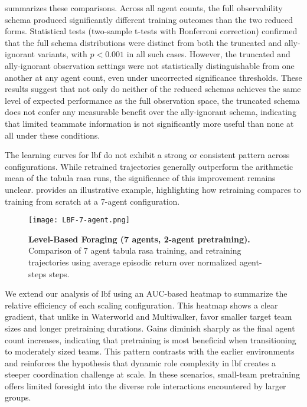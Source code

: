 \documentclass{article}
\begin{document}
 summarizes these comparisons. 
Across all agent counts, the full observability schema produced 
significantly different training outcomes than the two reduced forms. 
Statistical tests (two-sample t-tests with Bonferroni correction) 
confirmed that the full schema distributions were distinct from both the 
truncated and ally-ignorant variants, with $p < 0.001$ in all such cases. 
However, the truncated and ally-ignorant observation settings were not 
statistically distinguishable from one another at any agent count, 
even under uncorrected significance thresholds. 
These results suggest that not only do neither of 
the reduced schemas achieves the same level of 
expected performance as the full observation space, 
the truncated schema does not confer any measurable 
benefit over the ally-ignorant schema, indicating 
that limited teammate information is not significantly 
more useful than none at all under these conditions.

The learning curves for \gls{lbf} do not exhibit a strong or consistent 
pattern across configurations. While retrained trajectories 
generally outperform the arithmetic mean of the tabula rasa runs, 
the significance of this improvement remains unclear. 
 provides an illustrative example, highlighting how 
retraining compares to training from scratch at a 7-agent configuration.

\begin{figure}[!ht]
    \centering
    \texttt{[image: LBF-7-agent.png]}
    \caption{\textbf{Level-Based Foraging (7 agents, 2-agent pretraining).} Comparison of 
    7 agent tabula rasa training, and retraining trajectories using average 
    episodic return over normalized agent-steps steps.}
    \label{con1:fig:lbf-7}
\end{figure}

We extend our analysis of \gls{lbf} using an AUC-based heatmap to summarize the 
relative efficiency of each scaling configuration. 
This heatmap shows a clear gradient, that unlike in Waterworld and Multiwalker, 
favor smaller target team sizes and longer pretraining durations. 
Gains diminish sharply as the final agent count increases, 
indicating that pretraining is most beneficial when transitioning to moderately sized teams. 
This pattern contrasts with the earlier environments and reinforces the hypothesis that 
dynamic role complexity in \gls{lbf} creates a steeper coordination challenge at scale. 
In these scenarios, small-team pretraining offers limited foresight into the diverse role 
interactions encountered by larger groups.
\end{document}
